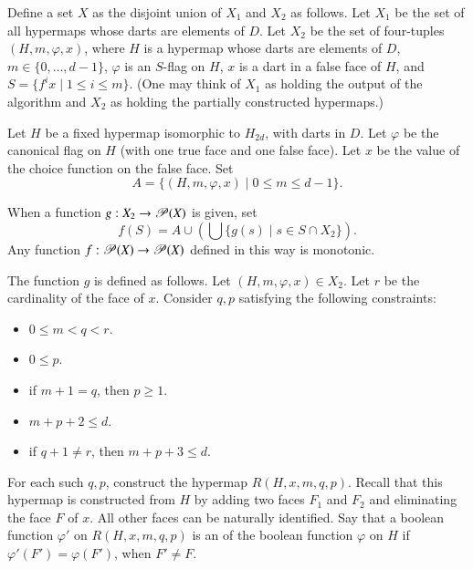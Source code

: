Define a set $X$ as the disjoint union of $X_1$ and $X_2$ as follows.
Let $X_1$ be the set of all hypermaps whose darts are elements of $D$.
Let $X_2$ be the set of four-tuples $(H,m,\varphi,x)$, where $H$ is a
hypermap whose darts are elements of $D$, $m\in\{0,\ldots,d-1\}$,
$\varphi$ is an $S$-flag on $H$, $x$ is a dart in a false face of $H$,
and $S = \{f^i x\mid 1 \le i \le m\}$.  (One may think of $X_1$ as
holding the output of the algorithm and $X_2$ as holding the partially
constructed hypermaps.)

Let $H$ be a fixed hypermap isomorphic to $H_{2d}$, with darts in $D$.
Let $\varphi$ be the canonical flag on $H$ (with one true face and one
false face).  Let $x$ be the value of the choice function on the false
face.  Set
\begin{displaymath}A = \{(H,m,\varphi,x) \mid 0\le m \le d-1
\}.\end{displaymath}

When a function 
$g:X_2 \to {\mathscr P}(X)$ is given, set 
\begin{displaymath}f(S) = A \cup (\bigcup \{g(s) \mid s\in S\cap
X_2\}).\end{displaymath} Any function $f :{\mathscr P}(X)\to
{\mathscr P}(X)$ defined in this way is monotonic.  %

The function $g$ is defined as follows.  Let $(H,m,\varphi,x)\in X_2$.
Let $r$ be the cardinality of the face of $x$.  Consider $q,p$
satisfying the following constraints:
\begin{itemize}
\item $0\le m < q < r$.
\item $0\le p$.
\item if $m+1 = q$, then $p \ge 1$.
\item $m+p+2 \le d$.
\item if $q+1\ne r$, then $m+p+3\le d$.
\end{itemize}

For each such $q,p$, construct the hypermap $R(H,x,m,q,p)$.  Recall
that this hypermap is constructed from $H$ by adding two faces $F_1$
and $F_2$ and eliminating the face $F$ of $x$.  All other faces can be
naturally identified.  Say that a boolean function $\varphi'$ on
$R(H,x,m,q,p)$ is an  of the boolean function
$\varphi$ on $H$ if $\varphi'(F') =\varphi(F')$, when $F'\ne F$.
%

